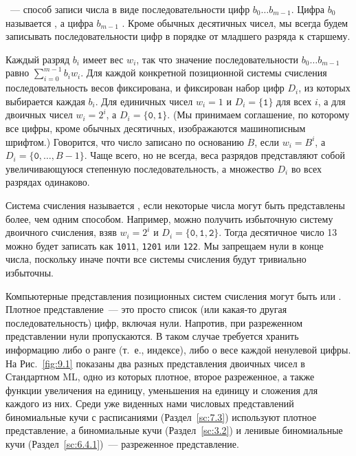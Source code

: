 \cite{Knuth1973b}~--- способ записи числа в виде последовательности
цифр $b_0\ldots b_{m-1}$. Цифра $b_0$ называется , а цифра $b_{m-1}$ . Кроме обычных десятичных чисел, мы всегда будем
записывать последовательности цифр в порядке от младшего разряда к старшему.

Каждый разряд $b_i$ имеет вес $w_i$, так что значение
последовательности $b_0\ldots b_{m-1}$ равно $\sum_{i=0}^{m-1}
b_iw_i$. Для каждой конкретной позиционной системы счисления
последовательность весов фиксирована, и фиксирован набор цифр $D_i$,
из которых выбирается каждая $b_i$. Для единичных чисел $w_i = 1$ и
$D_i = \{\mathtt{1}\}$ для всех $i$, а для двоичных чисел $w_i = 2^i$,
а $D_i = \{\mathtt{0}, \mathtt{1}\}$. (Мы принимаем соглашение, по
которому все цифры, кроме обычных десятичных, изображаются
машинописным шрифтом.) 
Говорится, что число записано по основанию $B$, если $w_i =
B^i$, а $D_i = \{\mathtt{0}, \ldots, B-1\}$. Чаще всего, но не всегда,
веса разрядов представляют собой увеличивающуюся степенную
последовательность, а множество $D_i$ во всех разрядах одинаково.

Система счисления называется , если
некоторые числа могут быть представлены более, чем одним способом.
Например, можно получить избыточную систему двоичного счисления, взяв
$w_i = 2^i$ и $D_i = \{\mathtt{0}, \mathtt{1}, \mathtt{2}\}$. Тогда
десятичное число 13 можно будет записать как \texttt{1011},
\texttt{1201} или \texttt{122}. Мы запрещаем нули в конце числа,
поскольку иначе почти все системы счисления будут тривиально
избыточны.

Компьютерные представления позиционных систем счисления могут быть
 или . Плотное
представление~--- это просто список (или какая-то другая
последовательность) цифр, включая нули. Напротив, при разреженном
представлении нули пропускаются. В таком случае требуется хранить
информацию либо о ранге (т.~е., индексе), либо о весе каждой ненулевой
цифры.  На Рис.~\ref{fig:9.1} показаны два разных представления
двоичных чисел в Стандартном ML, одно из которых плотное, второе
разреженное, а также функции увеличения на единицу, уменьшения на
единицу и сложения для каждого из них. Среди уже виденных нами
числовых представлений биномиальные кучи с расписаниями
(Раздел~\ref{sc:7.3}) используют плотное представление, а биномиальные
кучи (Раздел~\ref{sc:3.2}) и ленивые биномиальные кучи
(Раздел~\ref{sc:6.4.1})~--- разреженное представление.

